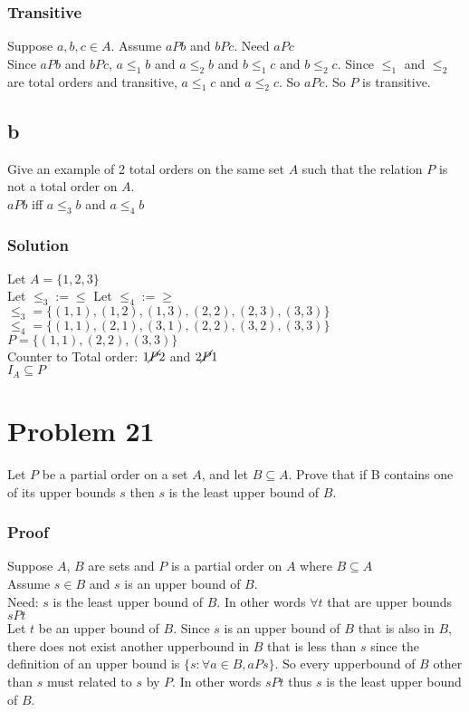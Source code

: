 \documentclass{article}
\begin{document}
\subsubsection*{Transitive}
Suppose $a,b,c \in A$.
Assume $aPb$ and $bPc$.
Need $aPc$\\
Since $aPb$ and $bPc$, $a\leq_1 b$ and $a\leq_2 b$ and $b\leq_1 c$ and $b\leq_2 c$. Since $\leq_1$ and $\leq_2$ are total orders and transitive, $a\leq_1 c$ and $a\leq_2 c$. So $aPc$. So $P$ is transitive.\\

\subsection*{b}
Give an example of 2 total orders on the same set $A$ such that the relation $P$ is not a total order on $A$.\\
$aPb$ iff $a\leq_3 b$ and $a\leq_4 b$\\
\subsubsection*{Solution}
Let $A = \{1,2,3\}$\\
Let $\leq_3 := \leq$
Let $\leq_4 := \geq$\\
$\leq_3 = \{ (1,1), (1,2), (1,3), (2,2), (2,3), (3,3) \}$\\
$\leq_4 = \{ (1,1), (2,1), (3,1), (2,2), (3,2), (3,3) \}$\\
$P = \{ (1,1), (2,2), (3,3)\}$\\
Counter to Total order: $1 \cancel{P} 2$ and $2 \cancel{P} 1$\\
$I_A \subseteq P$

\section*{Problem 21}
Let $P$ be a partial order on a set $A$, and let $B \subseteq A$. Prove that if B contains one of its upper bounds $s$ then $s$ is the least upper bound of $B$.
\subsubsection*{Proof}
Suppose $A$, $B$ are sets and $P$ is a partial order on $A$ where $B \subseteq A$\\
Assume $s \in B$ and $s$ is an upper bound of $B$.\\
Need: $s$ is the least upper bound of $B$. In other words $\forall t$ that are upper bounds $sPt$\\
Let $t$ be an upper bound of $B$. Since $s$ is an upper bound of $B$ that is also in $B$, there does not exist another upperbound in $B$ that is less than $s$ since the definition of an upper bound is $\{s: \forall a \in B, aPs\}$. So every upperbound of $B$ other than $s$ must related to $s$ by $P$. In other words $sPt$ thus $s$ is the least upper bound of $B$.\\ 
\end{document}
